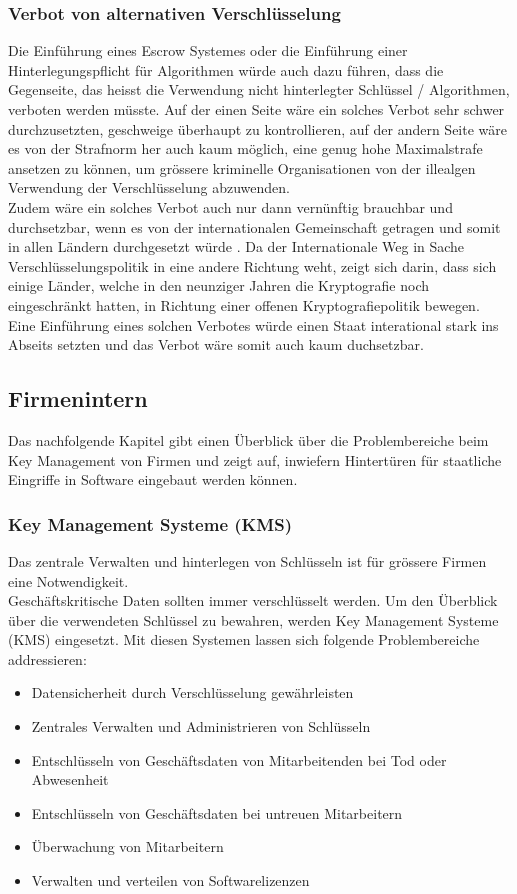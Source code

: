 	
	\subsubsection{Verbot von alternativen Verschlüsselung}
Die Einführung eines Escrow Systemes oder die Einführung einer Hinterlegungspflicht für Algorithmen würde auch dazu führen, dass die Gegenseite, das heisst die Verwendung nicht hinterlegter Schlüssel / Algorithmen, verboten werden müsste. Auf der einen Seite wäre ein solches Verbot sehr schwer durchzusetzten, geschweige überhaupt zu kontrollieren, auf der andern Seite wäre es von der Strafnorm her auch kaum möglich, eine genug hohe Maximalstrafe ansetzen zu können, um grössere kriminelle Organisationen von der illealgen Verwendung der Verschlüsselung abzuwenden. \cite{adminch} \\ %
Zudem wäre ein solches Verbot auch nur dann vernünftig brauchbar und durchsetzbar, wenn es von der internationalen Gemeinschaft getragen und somit in allen Ländern durchgesetzt würde \cite{denning}. Da der Internationale Weg in Sache Verschlüsselungspolitik in eine andere Richtung weht, zeigt sich darin, dass sich einige Länder, welche in den neunziger Jahren die Kryptografie noch eingeschränkt hatten, in Richtung einer offenen Kryptografiepolitik bewegen. \cite{clipperchip} \cite{adminch} \\ %
Eine Einführung eines solchen Verbotes würde einen Staat interational stark ins Abseits setzten und das Verbot wäre somit auch kaum duchsetzbar.
		
	\subsection{Firmenintern}
Das nachfolgende Kapitel gibt einen Überblick über die Problembereiche beim Key Management von Firmen und zeigt auf, inwiefern Hintertüren für staatliche Eingriffe in Software eingebaut werden können.

	\subsubsection{Key Management Systeme (KMS)}
Das zentrale Verwalten und hinterlegen von Schlüsseln ist für grössere Firmen eine Notwendigkeit. \\
Geschäftskritische Daten sollten immer verschlüsselt werden. Um den Überblick über die verwendeten Schlüssel zu bewahren, werden Key Management Systeme (KMS) eingesetzt.
Mit diesen Systemen lassen sich folgende Problembereiche addressieren:
\begin{itemize}
	\item Datensicherheit durch Verschlüsselung gewährleisten
	\item Zentrales Verwalten und Administrieren von Schlüsseln
	\item Entschlüsseln von Geschäftsdaten von Mitarbeitenden bei Tod oder Abwesenheit
	\item Entschlüsseln von Geschäftsdaten bei untreuen Mitarbeitern
  \item Überwachung von Mitarbeitern
  \item Verwalten und verteilen von Softwarelizenzen
\end{itemize}
	

